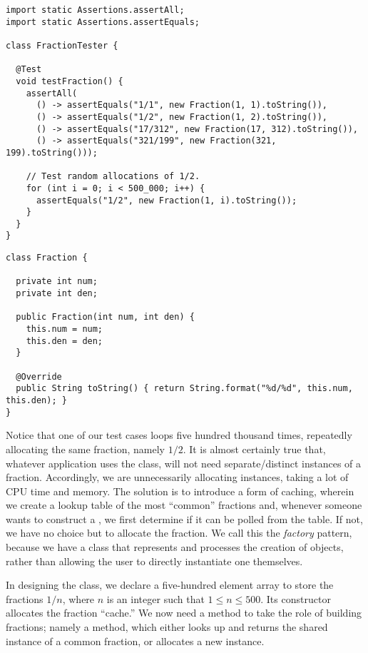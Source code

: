 \begin{cl}{}
\begin{lstlisting}[language=MyJava]
import static Assertions.assertAll;
import static Assertions.assertEquals;

class FractionTester {

  @Test
  void testFraction() {
    assertAll(
      () -> assertEquals("1/1", new Fraction(1, 1).toString()),
      () -> assertEquals("1/2", new Fraction(1, 2).toString()),
      () -> assertEquals("17/312", new Fraction(17, 312).toString()),
      () -> assertEquals("321/199", new Fraction(321, 199).toString()));

    // Test random allocations of 1/2.
    for (int i = 0; i < 500_000; i++) {
      assertEquals("1/2", new Fraction(1, i).toString());
    }
  } 
}
\end{lstlisting}
\end{cl}

\begin{cl}{}
\begin{lstlisting}[language=MyJava]
class Fraction {

  private int num;
  private int den;

  public Fraction(int num, int den) {
    this.num = num;
    this.den = den;
  }

  @Override
  public String toString() { return String.format("%d/%d", this.num, this.den); }
}
\end{lstlisting}
\end{cl}

Notice that one of our test cases loops five hundred thousand times, repeatedly allocating the same fraction, namely $1/2$. It is almost certainly true that, whatever application uses the  class, will not need separate/distinct instances of a fraction. Accordingly, we are unnecessarily allocating  instances, taking a lot of CPU time and memory. The solution is to introduce a form of caching, wherein we create a lookup table of the most ``common'' fractions and, whenever someone wants to construct a , we first determine if it can be polled from the table. If not, we have no choice but to allocate the fraction. We call this the \textit{factory} pattern, because we have a class that represents and processes the creation of  objects, rather than allowing the user to directly instantiate one themselves. 

In designing the  class, we declare a five-hundred element array to store the fractions $1/n$, where $n$ is an integer such that $1 \leq n \leq 500$. Its constructor allocates the fraction ``cache.'' We now need a method to take the role of building fractions; namely a  method, which either looks up and returns the shared instance of a common fraction, or allocates a new instance.

